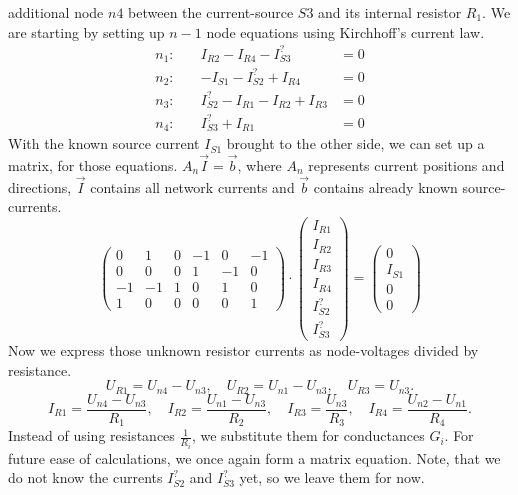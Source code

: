 {additional node $n4$ between the current-source $S3$ and its internal resistor $R_1$. We are starting by setting up 
$n-1$ node equations using Kirchhoff's current law.
\begin{align*}
   n_1: \quad&I_{R2}-I_{R4}-I_{S3}^? &= 0 \\
   n_2: \quad&-I_{S1} - I_{S2}^? + I_{R4} &= 0 \\
   n_3: \quad&I_{S2}^? - I_{R1} - I_{R2} + I_{R3} &= 0 \\
   n_4: \quad&I_{S3}^? + I_{R1} &= 0
\end{align*}
With the known source current $I_{S1}$ brought to the other side, we can set up a matrix, for those
equations. $A_n\vec{I} = \vec{b}$, where $A_n$ represents current positions and directions,
$\vec{I}$ contains all network currents and  $\vec{b}$ contains already known source-currents.
\begin{equation}
   \begin{pmatrix}
      0 & 1 & 0 & -1 & 0 & -1 \\
      0 & 0 & 0 & 1 & -1 & 0  \\
      -1 & -1 & 1 & 0 & 1 & 0 \\
      1 & 0 & 0 & 0 & 0 & 1  
   \end{pmatrix}
   \cdot
   \begin{pmatrix}
       I_{R1} \\ I_{R2} \\ I_{R3} \\ I_{R4} \\ I_{S2}^? \\ I_{S3}^? 
   \end{pmatrix}
   =
   \begin{pmatrix}
      0 \\ I_{S1} \\ 0 \\ 0  
   \end{pmatrix}
   \label{eqn:nodes}
\end{equation}
Now we express those unknown resistor currents as node-voltages divided by resistance.
\[
   U_{R1} = U_{n4} - U_{n3}, \quad U_{R2} = U_{n1} - U_{n3}, \quad U_{R3} = U_{n3}
.\] 
\[
   I_{R1} = \frac{U_{n4} - U_{n3}}{R_1}, \quad I_{R2} = \frac{U_{n1} - U_{n3}}{R_2}, \quad
   I_{R3} = \frac{U_{n3}}{R_3}, \quad I_{R4} = \frac{U_{n2} - U_{n1}}{R_4} 
.\]
\newpage
Instead of using resistances $\frac{1}{R_i}$,  we substitute them for conductances
$G_{i}$. For future ease of calculations, we once again form a matrix equation. Note, that we do not know
the currents $I_{S2}^?$ and $I_{S3}^?$ yet, so we leave them for now.
}
